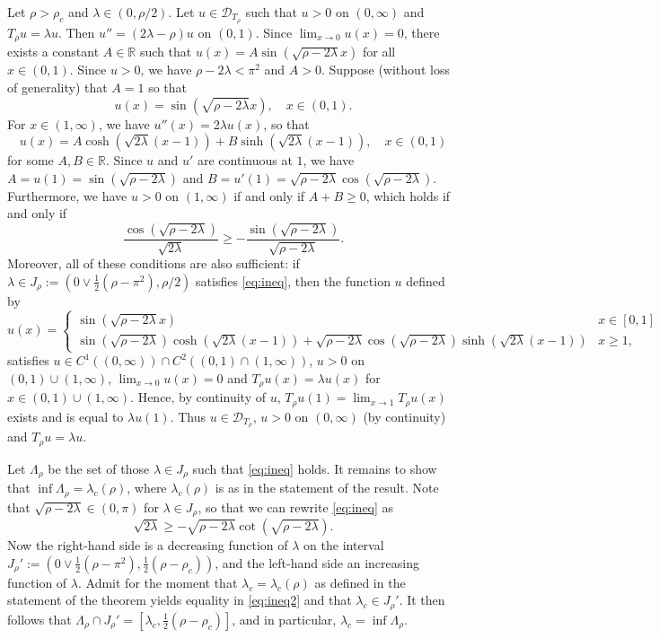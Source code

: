 \documentclass[11pt]{article}
\theoremstyle{plain}
\begin{document}
\begin{appendix}
Let $\rho > \rho_c$ and $\lambda \in(0,\rho/2)$. Let $u\in \mathcal D_{T_\rho}$ such that $u>0$ on $(0,\infty)$ and $T_\rho u = \lambda u$. Then $u'' = (2\lambda - \rho) u$ on $(0,1)$. Since $\lim_{x\to0}u(x) = 0$, there exists a constant $A\in\mathbb{R}$ such that  $u(x) = A\sin(\sqrt{\rho-2\lambda}x)$ for all $x\in(0,1)$. Since $u>0$, we have $\rho - 2\lambda < \pi^2$ and $A>0$. Suppose (without loss of generality) that $A=1$ so that $$u(x) = \sin(\sqrt{\rho-2\lambda}x), \quad x\in(0,1).$$
For $x\in(1,\infty)$, we have $u''(x) = 2\lambda u(x)$, so that $$u(x) = A\cosh(\sqrt{2\lambda}(x-1)) + B\sinh(\sqrt{2\lambda}(x-1)), \quad x\in(0,1)$$ for some $A,B\in\mathbb{R}$. Since $u$ and $u'$ are continuous at $1$, we have $A = u(1) = \sin(\sqrt{\rho-2\lambda})$ and $B = u'(1) = \sqrt{\rho-2\lambda}\cos(\sqrt{\rho-2\lambda})$. Furthermore, we have $u > 0$ on $(1,\infty)$ if and only if  $A+B \ge 0$, which holds if and only if
\begin{equation}\label{eq:ineq}
\frac{\cos(\sqrt{\rho-2\lambda})}{\sqrt{2\lambda}} \ge -\frac{\sin(\sqrt{\rho-2\lambda})}{\sqrt{\rho-2\lambda}}.
\end{equation}
Moreover, all of these conditions are also sufficient: if $\lambda\in J_\rho := (0\vee \frac12(\rho-\pi^2),\rho/2)$ satisfies \eqref{eq:ineq}, then the function $u$ defined by
\[
u(x) = \begin{cases}
 \sin(\sqrt{\rho-2\lambda}x)& x\in[0,1]\\
 \sin(\sqrt{\rho-2\lambda}) \cosh(\sqrt{2\lambda}(x-1)) + \sqrt{\rho-2\lambda}\cos(\sqrt{\rho-2\lambda})\sinh(\sqrt{2\lambda}(x-1))&x\ge 1,
\end{cases}
\]
satisfies $u\in C^1((0,\infty))\cap C^2((0,1)\cap(1,\infty))$, $u>0$ on $(0,1)\cup(1,\infty)$, $\lim_{x\to0} u(x) = 0$ and $T_\rho u(x) = \lambda u(x)$ for $x\in (0,1)\cup (1,\infty)$. Hence, by continuity of $u$, $T_\rho u(1) = \lim_{x\to1} T_\rho u(x)$ exists and is equal to  $\lambda u(1)$. Thus $u\in\mathcal D_{T_\rho}$, $u>0$ on $(0,\infty)$ (by continuity) and $T_\rho u = \lambda u$.

Let $\Lambda_\rho$ be the set of those $\lambda\in J_\rho$ such that \eqref{eq:ineq} holds. It remains to show that $\inf \Lambda_{\rho}= \lambda_c(\rho)$, where $\lambda_c(\rho)$ is as in the statement of the result. Note that $\sqrt{\rho-2\lambda} \in (0,\pi)$ for $\lambda\in J_\rho$, so that we can rewrite \eqref{eq:ineq} as
\begin{equation}
    \label{eq:ineq2}
    \sqrt{2\lambda} \ge -\sqrt{\rho-2\lambda}\cot(\sqrt{\rho-2\lambda}).
\end{equation}
Now the right-hand side is a decreasing function of $\lambda$ on the interval $J_\rho' := (0\vee \frac12(\rho-\pi^2),\frac12(\rho-\rho_c))$, and the left-hand side an increasing function of $\lambda$. Admit for the moment that $\lambda_c = \lambda_c(\rho)$ as defined in the statement of the theorem yields equality in \eqref{eq:ineq2} and that $\lambda_c \in J_\rho'$. It then follows that $\Lambda_\rho \cap J_\rho' = [\lambda_c,\frac12(\rho-\rho_c)]$, and in particular, $\lambda_c = \inf\Lambda_\rho$.


\end{appendix}
\end{document}
